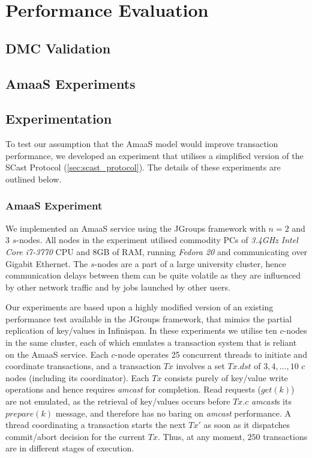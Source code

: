 \chapter{Performance Evaluation}

    \graphicspath{{Chapter6-PerformanceEvaluation/Figs/Vector/}{Chapter6-PerformanceEvaluation/Figs/}}
    

\section{DMC Validation}

\section{AmaaS Experiments}

\section{Experimentation}
	To test our assumption that the \textsf{AmaaS} model would improve transaction performance, we developed an experiment that utilises a simplified version of the \textsf{SCast} Protocol (\ref{sec:scast_protocol}).  The details of these experiments are outlined below. 
	
	\subsection*{AmaaS Experiment}
	We implemented an \textsf{AmaaS} service using the JGroups\citep{JGroups} framework with $n=2$ and $3$ $s$-nodes.  All nodes in the experiment utilised commodity PCs of \emph{3.4GHz Intel Core i7-3770} CPU and 8GB of RAM, running \emph{Fedora 20} and communicating over Gigabit Ethernet. The $s$-nodes are a part of a large university cluster, hence communication delays between them can be quite volatile as they are influenced by other network traffic and by jobs launched by other users.
	
	Our experiments are based upon a highly modified version of an existing performance test available in the JGroups\citep{JGroups} framework, that mimics the partial replication of key/values in Infinispan\citep{Infinispan}.  In these experiments we utilise ten $c$-nodes in the same cluster, each of which emulates a transaction system that is reliant on the \textsf{AmaaS} service.  Each $c$-node operates 25 concurrent threads to initiate and coordinate transactions, and a transaction $Tx$ involves a set $Tx.dst$ of $3,4,\ldots,10$ $c$ nodes (including its coordinator). Each $Tx$ consists purely of key/value write operations and hence requires \emph{amcast} for completion. Read requests ($get(k)$) are not emulated, as the retrieval of key/values occurs before $Tx.c$ \emph{amcast}s its $prepare(k)$ message, and therefore has no baring on \emph{amcast} performance.  A thread coordinating a transaction starts the next $Tx'$ as soon as it dispatches commit/abort decision for the current $Tx$. Thus, at any moment, $250$ transactions are in different stages of execution.
	
